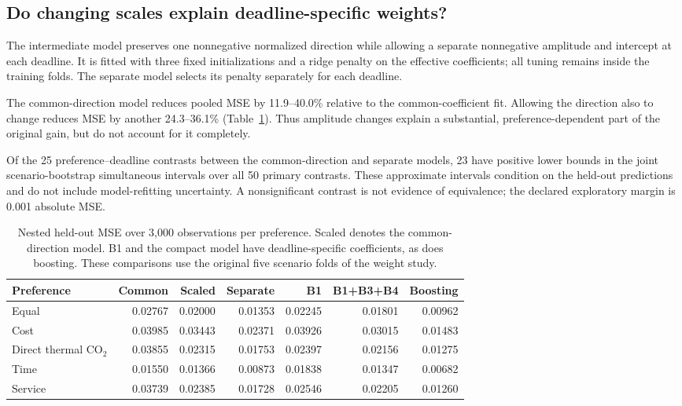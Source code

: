 \subsection{Do changing scales explain deadline-specific weights?}

\label{sec:revision_scale}

The intermediate model preserves one nonnegative normalized direction while allowing a separate nonnegative amplitude and intercept at each deadline. It is fitted with three fixed initializations and a ridge penalty on the effective coefficients; all tuning remains inside the training folds. The separate model selects its penalty separately for each deadline.

The common-direction model reduces pooled MSE by 11.9--40.0\% relative to the common-coefficient fit. Allowing the direction also to change reduces MSE by another 24.3--36.1\% (Table~\ref{tab:revision_models}). Thus amplitude changes explain a substantial, preference-dependent part of the original gain, but do not account for it completely.

Of the 25 preference--deadline contrasts between the common-direction and separate models, 23 have positive lower bounds in the joint scenario-bootstrap simultaneous intervals over all 50 primary contrasts. These approximate intervals condition on the held-out predictions and do not include model-refitting uncertainty. A nonsignificant contrast is not evidence of equivalence; the declared exploratory margin is 0.001 absolute MSE.

\begin{table}[htbp]\centering\small\begin{tabular}{lrrrrrr}\toprule

Preference & Common & Scaled & Separate & B1 & B1+B3+B4 & Boosting\\\midrule

Equal & 0.02767 & 0.02000 & 0.01353 & 0.02245 & 0.01801 & 0.00962\\

Cost & 0.03985 & 0.03443 & 0.02371 & 0.03926 & 0.03015 & 0.01483\\

Direct thermal CO$_2$ & 0.03855 & 0.02315 & 0.01753 & 0.02397 & 0.02156 & 0.01275\\

Time & 0.01550 & 0.01366 & 0.00873 & 0.01838 & 0.01347 & 0.00682\\

Service & 0.03739 & 0.02385 & 0.01728 & 0.02546 & 0.02205 & 0.01260\\

\bottomrule\end{tabular}\caption{Nested held-out MSE over 3,000 observations per preference. Scaled denotes the common-direction model. B1 and the compact model have deadline-specific coefficients, as does boosting. These comparisons use the original five scenario folds of the weight study.}\label{tab:revision_models}\end{table}

